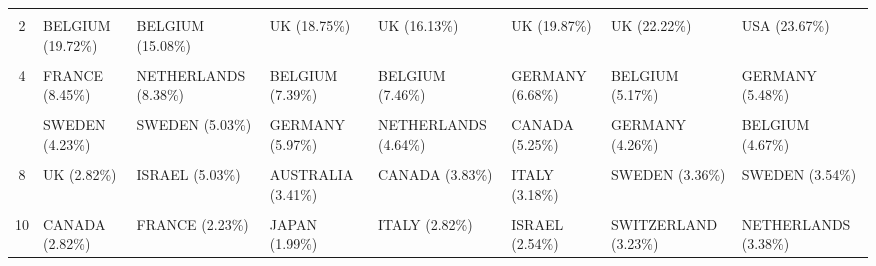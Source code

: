 \documentclass[
  12pt,
  onecolumn]{article}
\begin{document}
\begin{longtable}[t]{>{}c>{}l>{}l>{}l>{}l>{}l>{}l>{}l}
\endfoot
\bottomrule
\endlastfoot
\cellcolor{gray!6}{1} & \cellcolor{gray!6}{USA (26.76\%)} & \cellcolor{gray!6}{USA (27.37\%)} & \cellcolor{gray!6}{USA (31.82\%)} & \cellcolor{gray!6}{USA (27.82\%)} & \cellcolor{gray!6}{USA (26.55\%)} & \cellcolor{gray!6}{USA (25.71\%)} & \cellcolor{gray!6}{UK (23.83\%)}\\
2 & BELGIUM (19.72\%) & BELGIUM (15.08\%) & UK (18.75\%) & UK (16.13\%) & UK (19.87\%) & UK (22.22\%) & USA (23.67\%)\\
\cellcolor{gray!6}{3} & \cellcolor{gray!6}{NETHERLANDS (14.08\%)} & \cellcolor{gray!6}{UK (11.73\%)} & \cellcolor{gray!6}{FRANCE (7.67\%)} & \cellcolor{gray!6}{FRANCE (8.47\%)} & \cellcolor{gray!6}{FRANCE (9.06\%)} & \cellcolor{gray!6}{FRANCE (9.95\%)} & \cellcolor{gray!6}{FRANCE (8.21\%)}\\
4 & FRANCE (8.45\%) & NETHERLANDS (8.38\%) & BELGIUM (7.39\%) & BELGIUM (7.46\%) & GERMANY (6.68\%) & BELGIUM (5.17\%) & GERMANY (5.48\%)\\
\cellcolor{gray!6}{5} & \cellcolor{gray!6}{HUNGARY (4.23\%)} & \cellcolor{gray!6}{NORWAY (5.03\%)} & \cellcolor{gray!6}{ISRAEL (7.39\%)} & \cellcolor{gray!6}{GERMANY (5.24\%)} & \cellcolor{gray!6}{BELGIUM (5.56\%)} & \cellcolor{gray!6}{ITALY (4.26\%)} & \cellcolor{gray!6}{ITALY (5.48\%)}\\
\addlinespace
6 & SWEDEN (4.23\%) & SWEDEN (5.03\%) & GERMANY (5.97\%) & NETHERLANDS (4.64\%) & CANADA (5.25\%) & GERMANY (4.26\%) & BELGIUM (4.67\%)\\
\cellcolor{gray!6}{7} & \cellcolor{gray!6}{IRELAND (2.82\%)} & \cellcolor{gray!6}{GREECE (5.03\%)} & \cellcolor{gray!6}{NETHERLANDS (4.55\%)} & \cellcolor{gray!6}{SWEDEN (4.23\%)} & \cellcolor{gray!6}{NETHERLANDS (3.82\%)} & \cellcolor{gray!6}{NETHERLANDS (4.01\%)} & \cellcolor{gray!6}{SPAIN (4.51\%)}\\
8 & UK (2.82\%) & ISRAEL (5.03\%) & AUSTRALIA (3.41\%) & CANADA (3.83\%) & ITALY (3.18\%) & SWEDEN (3.36\%) & SWEDEN (3.54\%)\\
\cellcolor{gray!6}{9} & \cellcolor{gray!6}{GERMANY (2.82\%)} & \cellcolor{gray!6}{CANADA (5.03\%)} & \cellcolor{gray!6}{CANADA (3.12\%)} & \cellcolor{gray!6}{ISRAEL (3.63\%)} & \cellcolor{gray!6}{SWITZERLAND (3.02\%)} & \cellcolor{gray!6}{CANADA (3.23\%)} & \cellcolor{gray!6}{SWITZERLAND (3.38\%)}\\
10 & CANADA (2.82\%) & FRANCE (2.23\%) & JAPAN (1.99\%) & ITALY (2.82\%) & ISRAEL (2.54\%) & SWITZERLAND (3.23\%) & NETHERLANDS (3.38\%)\\*
\end{longtable}
\endgroup{}
\end{document}
